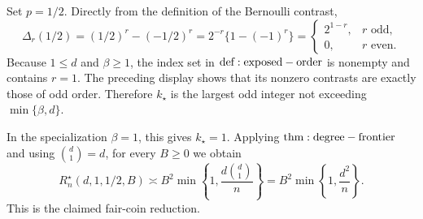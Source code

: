 Set \(p=1/2\). Directly from the definition of the Bernoulli contrast,
\[
\Delta_r(1/2)
=(1/2)^r-(-1/2)^r
=2^{-r}\{1-(-1)^r\}
=\begin{cases}
2^{1-r},&r\text{ odd},\\
0,&r\text{ even}.
\end{cases}
\]
Because \(1\le d\) and \(\beta\ge1\), the index set in \({\rm def:exposed-order}\) is nonempty and contains \(r=1\). The preceding display shows that its nonzero contrasts are exactly those of odd order. Therefore \(k_\star\) is the largest odd integer not exceeding \(\min\{\beta,d\}\).

In the specialization \(\beta=1\), this gives \(k_\star=1\). Applying \({\rm thm:degree-frontier}\) and using \(\binom d1=d\), for every \(B\ge0\) we obtain
\[
R_n^\star(d,1,1/2,B)
\asymp B^2\min\!\left\{1,\frac{d\binom d1}{n}\right\}
=B^2\min\!\left\{1,\frac{d^2}{n}\right\}.
\]
This is the claimed fair-coin reduction.